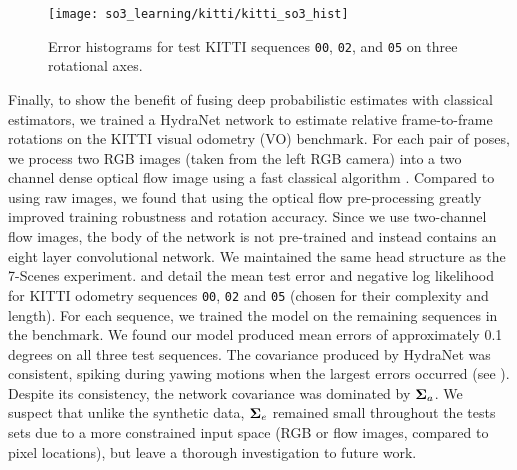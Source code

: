 \begin{figure}
	\centering
	\texttt{[image: so3\_learning/kitti/kitti\_so3\_hist]}
	\caption{Error histograms for test KITTI sequences \texttt{00}, \texttt{02}, and \texttt{05} on three rotational axes.}
	\label{fig:kitti_hists}
	\vspace{-.5em}
\end{figure}

Finally, to show the benefit of fusing deep probabilistic estimates with classical estimators, we trained a HydraNet network to estimate relative frame-to-frame rotations on the KITTI visual odometry (VO) benchmark. For each pair of poses, we process two RGB images (taken from the left RGB camera) into a two channel dense optical flow image using a fast classical algorithm \citep{farneback2003}. Compared to using raw images, we found that using the optical flow pre-processing greatly improved training robustness and rotation accuracy. Since we use two-channel flow images, the body of the network is not pre-trained and instead contains an eight layer convolutional network. We maintained the same head structure as the 7-Scenes experiment.  and  detail the mean test error and negative log likelihood for KITTI odometry sequences \texttt{00}, \texttt{02} and \texttt{05} (chosen for their complexity and length). For each sequence, we trained the model on the remaining sequences in the benchmark. We found our model produced mean errors of approximately 0.1 degrees on all three test sequences. The covariance produced by HydraNet was consistent, spiking during yawing motions when the largest errors occurred (see ). Despite its consistency, the network covariance was dominated by $\boldsymbol{\mathbf{\Sigma}}_a$. We suspect that unlike the synthetic data, $\boldsymbol{\mathbf{\Sigma}}_e$ remained small throughout the tests sets due to a more constrained input space (RGB or flow images, compared to pixel locations), but leave a thorough investigation to future work. 
 
